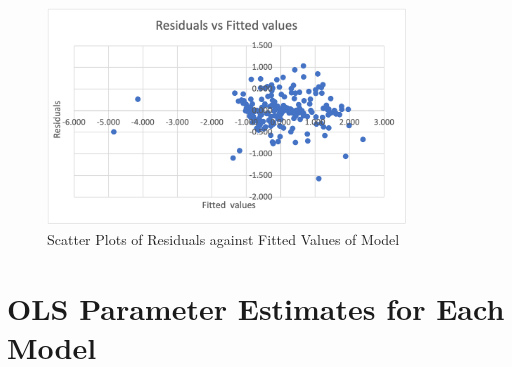 \documentclass{article}
\begin{document}
\begin{appendices}
\begin{figure}[H]
    \centering
    \includegraphics[width=0.85\textwidth]{Images/resfit.png}
    \caption{Scatter Plots of Residuals against Fitted Values of Model}
    \label{fig:scatterresfit}
\end{figure}

\section{OLS Parameter Estimates for Each Model}\label{AppB}


\end{appendices}
\end{document}
